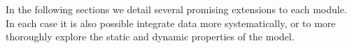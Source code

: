 In the following sections we detail several promising extensions to each module. In each case it is also possible integrate data more systematically, or to more thoroughly explore the static and dynamic properties of the model. 









